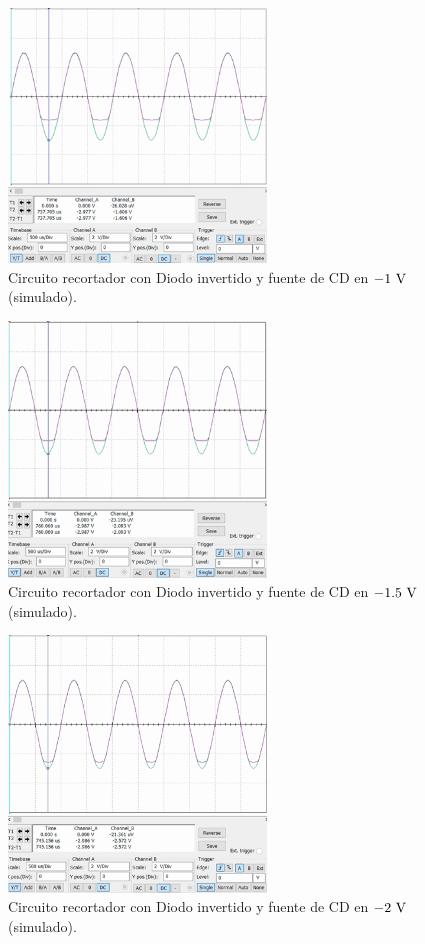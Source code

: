 \documentclass[journal]{IEEEtran}
\begin{document}
\begin{figure}[H]
        \centering
        \includegraphics[width=2.7in]{SignalSimulated_17.png}
        \caption{Circuito recortador con Diodo invertido y fuente de CD en $-1~\textnormal{V}$ (simulado).}
        \label{fig:SignalSimulated_17}
\end{figure}
\begin{figure}[H]
        \centering
        \includegraphics[width=2.7in]{SignalSimulated_18.png}
        \caption{Circuito recortador con Diodo invertido y fuente de CD en $-1.5~\textnormal{V}$ (simulado).}
        \label{fig:SignalSimulated_18}
\end{figure}
\begin{figure}[H]
        \centering
        \includegraphics[width=2.7in]{SignalSimulated_19.png}
        \caption{Circuito recortador con Diodo invertido y fuente de CD en $-2~\textnormal{V}$ (simulado).}
        \label{fig:SignalSimulated_19}
\end{figure}
\end{document}
